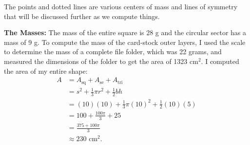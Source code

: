 \documentclass[12pt]{amsart}
\begin{document}


\bigskip

The points and dotted lines are various centers of mass and lines of symmetry that will be discussed further as we compute things.

\newpage

{\bf The Masses:} The mass of the entire square is 28 g and the circular sector has a mass of 9 g.  To compute the mass of the card-stock outer layers, I used the scale to determine the mass of a complete file folder, which was 22 grams, and measured the dimensions of the folder to get the area of 1323 cm$^2$.  I computed the area of my entire shape:
\begin{align*}A & = A_{\text{sq}} + A_{\text{se}} + A_{\text{tri}}\\
& = s^2 + \frac{1}{3}\pi r^2 + \frac{1}{2}bh\\
& = (10)(10) + \frac{1}{3}\pi(10)^2 + \frac{1}{2}(10)(5)\\
& = 100 + \frac{100\pi}{3} + 25\\
& = \frac{375 + 100\pi}{3}\\
& \approx 230\text{ cm}^2.
\end{align*}
\end{document}

